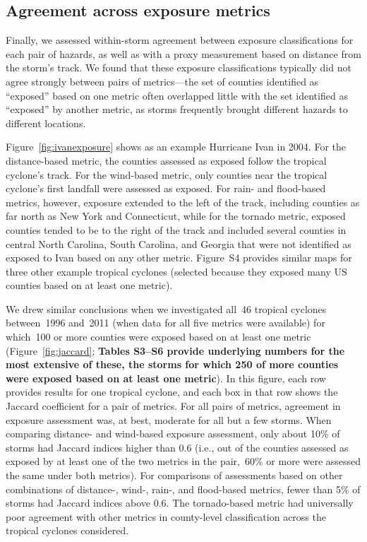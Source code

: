 \subsection*{Agreement across exposure metrics}

Finally, we assessed within-storm agreement between exposure classifications
for each pair of hazards, as well as with a proxy measurement based on distance
from the storm's track. We found that these exposure classifications typically
did not agree strongly between pairs of metrics---the set of counties
identified as ``exposed'' based on one metric often overlapped little with the
set identified as ``exposed'' by another metric, as storms frequently brought
different hazards to different locations. 

Figure~\ref{fig:ivanexposure} shows as an example Hurricane Ivan in 2004.
For the distance-based metric, the counties assessed as exposed follow the
tropical cyclone's track. For the wind-based metric,
only counties near the tropical cyclone's first landfall were assessed as
exposed. For rain- and flood-based metrics, however, exposure extended to the
left of the track, including counties as far north as New York and Connecticut,
while for the tornado metric, exposed counties tended to be to the right of the
track and included several counties in central North Carolina, South Carolina,
and Georgia that were not identified as exposed to Ivan based on any other
metric. Figure~S4 provides similar maps for three other example tropical
cyclones (selected because they exposed many \ac{US}  counties based on at
least one metric).

We drew similar conclusions when we investigated all~46 tropical cyclones
between~1996 and~2011 (when data for all five metrics were available) for
which~100 or more counties were exposed based on at least one metric
(Figure~\ref{fig:jaccard}; \textbf{Tables S3--S6 provide underlying
numbers for the most extensive of these, the storms for which 250 of more
counties were exposed based on at least one metric}). In this figure, each row
provides results for one tropical cyclone, and each box in that row shows the
Jaccard coefficient for a pair of metrics. For all pairs of metrics, agreement
in exposure assessment was, at best, moderate for all but a few storms. When
comparing distance- and wind-based exposure assessment, only about 10\% of
storms had Jaccard indices higher than 0.6 (i.e., out of the counties assessed
as exposed by at least one of the two metrics in the pair,~60\si{\percent} or
more were assessed the same under both metrics). For comparisons of assessments
based on other combinations of distance-, wind-, rain-, and flood-based
metrics, fewer than 5\% of storms had Jaccard indices above 0.6.  The
tornado-based metric had universally poor agreement with other metrics in
county-level classification across the tropical cyclones considered.  

